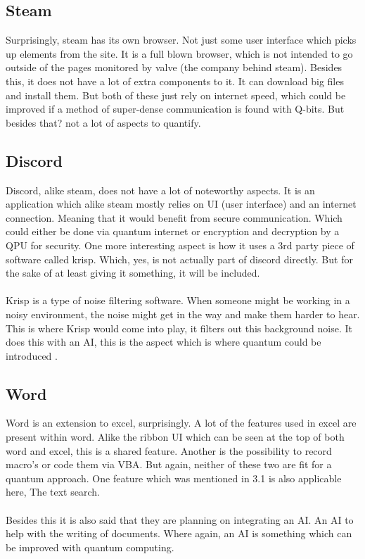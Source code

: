 \subsection{Steam}
Surprisingly, steam has its own browser. Not just some user interface which picks up elements from the site. It is a full blown browser, which is not intended to go outside of the pages monitored by valve (the company behind steam). Besides this, it does not have a lot of extra components to it. It can download big files and install them. But both of these just rely on internet speed, which could be improved if a method of super-dense communication is found with Q-bits. But besides that? not a lot of aspects to quantify.

\subsection{Discord}
Discord, alike steam, does not have a lot of noteworthy aspects. It is an application which alike steam mostly relies on UI (user interface) and an internet connection. Meaning that it would benefit from secure communication. Which could either be done via quantum internet or encryption and decryption by a QPU for security. One more interesting aspect is how it uses a 3rd party piece of software called krisp. Which, yes, is not actually part of discord directly. But for the sake of at least giving it something, it will be included. 
\\\\
Krisp is a type of noise filtering software. When someone might be working in a noisy environment, the noise might get in the way and make them harder to hear. This is where Krisp would come into play, it filters out this background noise. It does this with an AI, this is the aspect which is where quantum could be introduced \cite{quantumai}. 

\subsection{Word}
Word is an extension to excel, surprisingly. A lot of the features used in excel are present within word. Alike the ribbon UI which can be seen at the top of both word and excel, this is a shared feature. Another is the possibility to record macro's or code them via VBA. But again, neither of these two are fit for a quantum approach. One feature which was mentioned in 3.1 is also applicable here, The text search. 
\\\\
Besides this it is also said that they are planning on integrating an AI. An AI to help with the writing of documents. Where again, an AI is something which can be improved with quantum computing.

